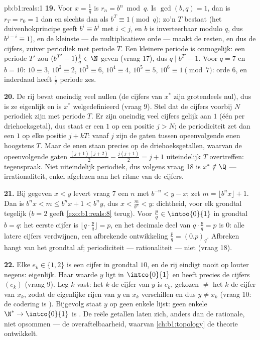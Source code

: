 \begin{solution}{pb:b1:reals:1}
\textbf{19.} Voor $x = \frac 1q$ is $r_n = b^n \bmod q$. Is $\gcd(b, q) =
1$, dan is $r_T = r_0 = 1$ dan en slechts dan als $b^T \equiv 1 \pmod q$;
zo'n $T$ bestaat (het duivenhokprincipe geeft $b^i \equiv b^j$ met $i <
j$, en $b$ is inverteerbaar modulo $q$, dus $b^{j-i} \equiv 1$), en de
kleinste --- de multiplicatieve orde --- maakt de resten, en dus de
cijfers, zuiver periodiek met periode $T$. Een kleinere periode is
onmogelijk: een periode $T'$ zou $(b^{T'} - 1)\frac1q \in \N$ geven
(vraag 17), dus $q \mid b^{T'} - 1$. Voor $q = 7$ en $b = 10$: $10 \equiv
3$, $10^2 \equiv 2$, $10^3 \equiv 6$, $10^4 \equiv 4$, $10^5 \equiv 5$,
$10^6 \equiv 1 \pmod 7$: orde $6$, en inderdaad heeft $\frac 17$ periode
zes.

\textbf{20.} De rij bevat oneindig veel nullen (de cijfers van $x^*$ zijn
grotendeels nul), dus is ze eigenlijk en is $x^*$ welgedefinieerd (vraag
9). Stel dat de cijfers voorbij $N$ periodiek zijn met periode $T$. Er
zijn oneindig veel cijfers gelijk aan $1$ (één per driehoeksgetal), dus
staat er een $1$ op een positie $j > N$; de periodiciteit zet dan een $1$
op elke positie $j + kT$: vanaf $j$ zijn de gaten tussen opeenvolgende
enen hoogstens $T$. Maar de enen staan precies op de driehoeksgetallen,
waarvan de opeenvolgende gaten $\frac{(j+1)(j+2)}{2} - \frac{j(j+1)}{2} =
j + 1$ uiteindelijk $T$ overtreffen: tegenspraak. Niet uiteindelijk
periodiek, dus volgens vraag 18 is $x^* \notin \Q$ --- irrationaliteit,
enkel afgelezen aan het ritme van de cijfers.

\textbf{21.} Bij gegeven $x < y$ levert vraag 7 een $n$ met $b^{-n} < y -
x$; zet $m = \lfloor b^n x \rfloor + 1$. Dan is $b^n x < m \leq b^n x + 1
< b^n y$, dus $x < \frac{m}{b^n} < y$: dichtheid, voor elk grondtal
tegelijk ($b = 2$ geeft \cref{exo:b1:reals:8} terug). Voor $\frac pq \in
\intoo{0}{1}$ in grondtal $b = q$: het eerste cijfer is $\lfloor q \cdot
\frac pq \rfloor = p$, en het decimale deel van $q \cdot \frac pq = p$ is
$0$: alle latere cijfers verdwijnen, een afbrekende ontwikkeling $\frac
pq = (0.p)_q$. Afbreken hangt van het grondtal af; periodiciteit ---
rationaliteit --- niet (vraag 18).

\textbf{22.} Elke $e_k \in \{1, 2\}$ is een cijfer in grondtal $10$, en
de rij eindigt nooit op louter negens: eigenlijk. Haar waarde $y$ ligt in
$\intco{0}{1}$ en heeft precies de cijfers $(e_k)$ (vraag 9). Leg $k$
vast: het $k$-de cijfer van $y$ is $e_k$, gekozen $\neq$ het $k$-de
cijfer van $x_k$, zodat de eigenlijke rijen van $y$ en $x_k$ verschillen
en dus $y \neq x_k$ (vraag 10: de codering is ). Bijgevolg staat
$y$ op geen enkele lijst: geen enkele  $\N^* \to \intco{0}{1}$
is . De reële getallen laten zich, anders dan de rationale,
niet opsommen --- de overaftelbaarheid, waarvan \cref{ch:b1:topology} de
theorie ontwikkelt.


\end{solution}
